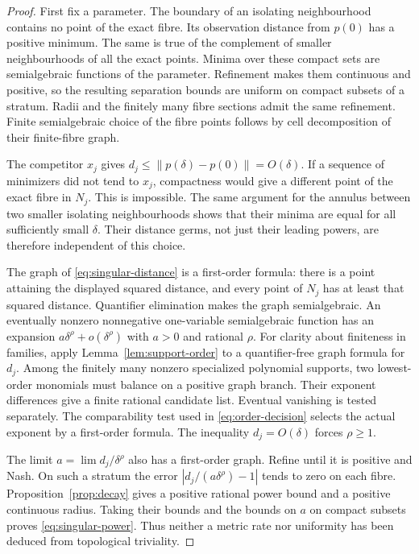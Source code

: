 \begin{proof}
First fix a parameter. The boundary of an isolating neighbourhood
contains no point of the exact fibre. Its observation distance from
$p(0)$ has a positive minimum. The same is true of the complement of
smaller neighbourhoods of all the exact points. Minima over these compact
sets are semialgebraic functions of the parameter. Refinement makes them
continuous and positive, so the resulting separation bounds are uniform
on compact subsets of a stratum. Radii and the finitely many fibre
sections admit the same refinement. Finite semialgebraic choice of the
fibre points follows by cell decomposition of their finite-fibre graph.

The competitor $x_j$ gives $d_j\le\|p(\delta)-p(0)\|=O(\delta)$.
If a sequence of minimizers did not tend to $x_j$, compactness would
give a different point of the exact fibre in $N_j$. This is impossible.
The same argument for the annulus between two smaller isolating
neighbourhoods shows that their minima are equal for all sufficiently
small $\delta$. Their distance germs, not just their leading powers,
are therefore independent of this choice.

The graph of \eqref{eq:singular-distance} is a first-order formula:
there is a point attaining the displayed squared distance, and every
point of $N_j$ has at least that squared distance. Quantifier elimination
makes the graph semialgebraic. An eventually nonzero nonnegative
one-variable semialgebraic function has an expansion
$a\delta^\rho+o(\delta^\rho)$ with $a>0$ and rational $\rho$.
For clarity about finiteness in families, apply
Lemma~\ref{lem:support-order} to a quantifier-free graph formula for
$d_j$. Among the finitely many nonzero specialized polynomial supports,
two lowest-order monomials must balance on a positive graph branch.
Their exponent differences give a finite rational candidate list.
Eventual vanishing is tested separately. The comparability test used in
\eqref{eq:order-decision} selects the actual exponent by a first-order
formula. The inequality $d_j=O(\delta)$ forces $\rho\ge1$.

The limit $a=\lim d_j/\delta^\rho$ also has a first-order graph.
Refine until it is positive and Nash. On such a stratum the error
$|d_j/(a\delta^\rho)-1|$ tends to zero on each fibre.
Proposition~\ref{prop:decay} gives a positive rational power bound and
a positive continuous radius. Taking their bounds and the bounds on $a$
on compact subsets proves \eqref{eq:singular-power}. Thus neither a
metric rate nor uniformity has been deduced from topological triviality.


\end{proof}
